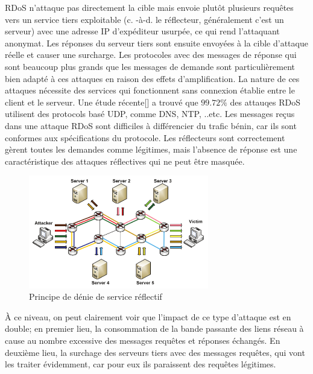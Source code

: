RDoS n’attaque pas directement la cible mais envoie plutôt plusieurs requêtes vers un service tiers exploitable (c. -à-d. le réflecteur, généralement c'est un serveur) avec une adresse IP d’expéditeur usurpée, ce qui rend l'attaquant anonymat. Les réponses du serveur tiers sont ensuite envoyées à la cible d’attaque réelle et causer une surcharge. Les protocoles avec des messages de réponse qui sont beaucoup plus grands que les messages de demande sont particulièrement bien adapté à ces attaques en raison des effets d’amplification. La nature de ces attaques nécessite des services qui fonctionnent sans connexion établie entre le client et le serveur. Une étude récente[\cite{20}] a trouvé que $ 99.72\% $ des attauqes RDoS utilisent des protocols basé UDP, comme DNS, NTP, ..etc. Les messages reçus dans une attaque RDoS sont difficiles à différencier du trafic bénin, car ils sont conformes aux spécifications du protocole. Les réflecteurs sont correctement gèrent toutes les demandes comme légitimes, mais l’absence de réponse est une caractéristique des attaques réflectives qui ne peut être masquée.

\begin{figure}[h]
\centering
\includegraphics[width=0.7\textwidth]{Figures/rDoS}
\decoRule
\caption{Principe de dénie de service réflectif}
\label{fig:rDoS}
\end{figure} 

À ce niveau, on peut clairement voir que l'impact de ce type d'attaque est en double; en premier lieu, la consommation de la bande passante des liens réseau à cause au nombre excessive des messages requêtes et réponses échangés. En deuxième lieu, la surchage des serveurs tiers avec des messages requêtes, qui vont les traiter évidemment, car pour eux ils paraissent des requêtes légitimes.\\ 

